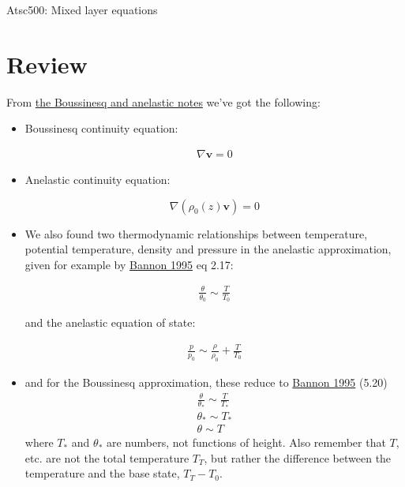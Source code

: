 \documentclass[12pt]{article}
\newcommand{\vect}[1]{\mathbf{{#1}}}
\begin{document}
\pagestyle{first}

\begin{center}
Atsc500: Mixed layer equations\\
\end{center}
\section{Review}
\label{sec:sum9}

From 
\href{https://www.dropbox.com/scl/fi/e6cq3sodf0fq2rwuynsfm/boussinesq.pdf?rlkey=8josihsmcn1fskhl6mvnlu4eh&dl=0}{the Boussinesq and anelastic notes} we've got the following:


\begin{itemize}
\item Boussinesq continuity equation:

\begin{gather}
  \label{eq:bous2}
\nabla \vect{v} =0
\end{gather}


\item Anelastic continuity equation:

\begin{equation}
  \label{eq:anel2}
  \nabla ( \rho_0(z) \vect{v} ) = 0
\end{equation}


\item We also found two thermodynamic relationships between
temperature, potential temperature, density and pressure in the anelastic
approximation, given for example by 
\href{https://journals.ametsoc.org/doi/abs/10.1175/1520-0469%281995%29052%3C2302%3APVCHAA%3E2.0.CO%3B2}{Bannon 1995} eq 2.17:

\begin{gather}
  \frac{ \theta}{\theta_0} \sim \frac{T }{T_0} 
\end{gather}

and the anelastic equation of state:

\begin{gather}
  \frac{p }{p_0}  \sim \frac{ \rho}{\rho_0}  + \frac{T }{T_0} 
\end{gather}


\item and for the Boussinesq approximation, these reduce to 
\href{/Users/phil/Dropbox/phil_files/a500/docs/bannon95a.pdf}{Bannon 1995} (5.20)
\begin{gather}
  \frac{ \theta}{\theta_*} \sim \frac{T }{T_*} \\
\theta_* \sim T_* \\
\theta \sim T
\end{gather}
where $T_*$ and $\theta_*$ are numbers, not functions of height.  Also remember
that $T$, etc. are not the total temperature $T_T$, but rather 
the difference between the temperature and the base state, $T_T - T_0$.


\end{itemize}
\end{document}
